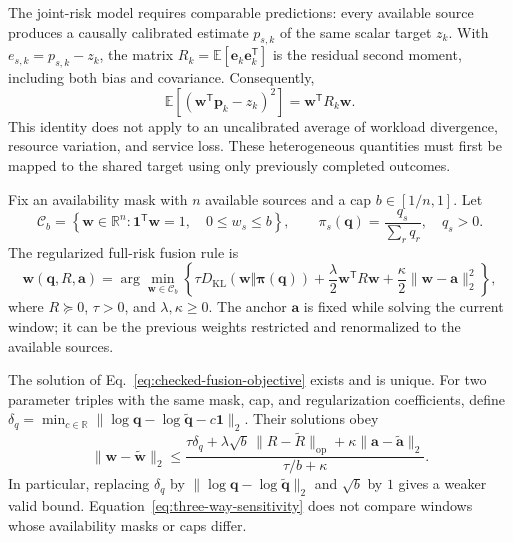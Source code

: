 The joint-risk model requires comparable predictions: every available source
produces a causally calibrated estimate $p_{s,k}$ of the same scalar target
$z_k$. With $e_{s,k}=p_{s,k}-z_k$, the matrix
$R_k=\mathbb E[\boldsymbol e_k\boldsymbol e_k^{\mathsf T}]$ is the residual
second moment, including both bias and covariance. Consequently,
\begin{equation}
 \mathbb E\!\left[(\boldsymbol w^{\mathsf T}\boldsymbol p_k-z_k)^2\right]
 =\boldsymbol w^{\mathsf T}R_k\boldsymbol w.
 \label{eq:joint-risk-identity}
\end{equation}
This identity does not apply to an uncalibrated average of workload divergence,
resource variation, and service loss. These heterogeneous quantities must first
be mapped to the shared target using only previously completed outcomes.

Fix an availability mask with $n$ available sources and a cap
$b\in[1/n,1]$. Let
\begin{equation}
 \mathcal C_b=\left\{\boldsymbol w\in\mathbb R^n:
 \boldsymbol 1^{\mathsf T}\boldsymbol w=1,\quad 0\le w_s\le b\right\},
 \qquad
 \pi_s(\boldsymbol q)=\frac{q_s}{\sum_r q_r},\quad q_s>0.
\end{equation}
The regularized full-risk fusion rule is
\begin{equation}
 \boldsymbol w(\boldsymbol q,R,\boldsymbol a)=
 \arg\min_{\boldsymbol w\in\mathcal C_b}
 \left\{
 \tau D_{\mathrm{KL}}(\boldsymbol w\Vert\boldsymbol\pi(\boldsymbol q))
 +\frac{\lambda}{2}\boldsymbol w^{\mathsf T}R\boldsymbol w
 +\frac{\kappa}{2}\|\boldsymbol w-\boldsymbol a\|_2^2
 \right\},
 \label{eq:checked-fusion-objective}
\end{equation}
where $R\succeq0$, $\tau>0$, and $\lambda,\kappa\ge0$.
The anchor $\boldsymbol a$ is fixed while solving the current window; it can be
the previous weights restricted and renormalized to the available sources.

\begin{proposition}
\label{prop:fusion-sensitivity}
The solution of Eq.~\eqref{eq:checked-fusion-objective} exists and is unique.
For two parameter triples with the same mask, cap, and regularization
coefficients, define
$\delta_q=\min_{c\in\mathbb R}
 \|\log\boldsymbol q-\log\widetilde{\boldsymbol q}-c\boldsymbol1\|_2$.
Their solutions obey
\begin{equation}
 \|\boldsymbol w-\widetilde{\boldsymbol w}\|_2
 \le
 \frac{
  \tau\delta_q+
  \lambda\sqrt b\,\|R-\widetilde R\|_{\mathrm{op}}+
  \kappa\|\boldsymbol a-\widetilde{\boldsymbol a}\|_2
 }{\tau/b+\kappa}.
 \label{eq:three-way-sensitivity}
\end{equation}
In particular, replacing $\delta_q$ by
$\|\log\boldsymbol q-\log\widetilde{\boldsymbol q}\|_2$ and $\sqrt b$ by
$1$ gives a weaker valid bound. Equation~\eqref{eq:three-way-sensitivity}
does not compare windows whose availability masks or caps differ.
\end{proposition}

